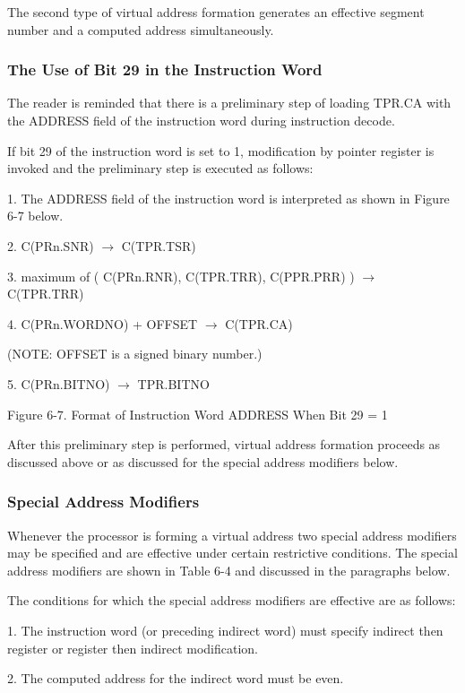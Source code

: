 The second type of virtual address formation generates an effective segment number and a computed address simultaneously.

\subsubsection{The Use of Bit 29 in the Instruction Word}


The reader is reminded that there is a preliminary step of loading TPR.CA with
the ADDRESS field of the instruction word during instruction decode.


If bit 29 of the instruction word is set to 1, modification by pointer register
is invoked and the preliminary step is executed as follows:


1. The ADDRESS field of the instruction word is interpreted as shown in Figure
6-7 below.  

2. C(PRn.SNR) $\rightarrow$ C(TPR.TSR)

3. maximum of ( C(PRn.RNR), C(TPR.TRR), C(PPR.PRR) ) $\rightarrow$ C(TPR.TRR) 

4. C(PRn.WORDNO) + OFFSET $\rightarrow$ C(TPR.CA)


(NOTE: OFFSET is a signed binary number.)


5. C(PRn.BITNO) $\rightarrow$ TPR.BITNO


Figure 6-7. Format of Instruction Word ADDRESS When Bit 29 = 1


After this preliminary step is performed, virtual address formation proceeds as discussed above or as discussed for the special address modifiers below.

\subsubsection{Special Address Modifiers}

Whenever the processor is forming a virtual address two special address
modifiers may be specified and are effective under certain restrictive
conditions. The special address modifiers are shown in Table 6-4 and discussed
in the paragraphs below.


The conditions for which the special address modifiers are effective are as
follows: 

1. The instruction word (or preceding indirect word) must specify indirect then
register or register then indirect modification.


2. The computed address for the indirect word must be even.


